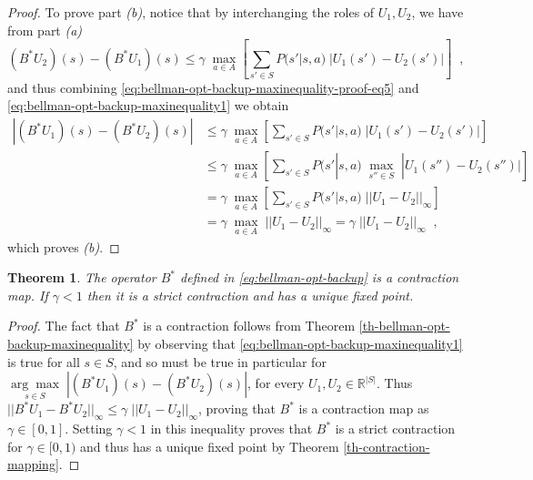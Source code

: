 \documentclass{article}
\newtheorem{theorem}{Theorem}[section]
\theoremstyle{definition}
\theoremstyle{remark}
\begin{document}
\begin{proof}
To prove part \textit{(b)}, notice that by interchanging the roles of $U_1, U_2$, we have from part \textit{(a)}
\begin{equation}
(B^{\ast}U_2)(s) - (B^{\ast}U_1)(s) \leq \gamma \; \underset{a \in A}{\max} \left[ \sum_{s' \in S} P(s'|s,a) \; |U_1(s') - U_2(s')| \right] \;\; ,
\label{eq:bellman-opt-backup-maxinequality-proof-eq5}
\end{equation}
and thus combining \eqref{eq:bellman-opt-backup-maxinequality-proof-eq5} and \eqref{eq:bellman-opt-backup-maxinequality1} we obtain
\begin{equation}
\begin{split}
|(B^{\ast}U_1)(s) - (B^{\ast}U_2)(s)| & \leq \gamma \; \underset{a \in A}{\max} \left[ \sum_{s' \in S} P(s'|s,a) \; |U_1(s') - U_2(s')| \right] \\
& \leq \gamma \; \underset{a \in A}{\max} \left[ \sum_{s' \in S} P(s'|s,a) \; \underset{s'' \in S}{\max} \; |U_1(s'') - U_2(s'')| \right] \\
&= \gamma \; \underset{a \in A}{\max} \left[ \sum_{s' \in S} P(s'|s,a) \; ||U_1 - U_2||_{\infty} \right] \\
&= \gamma \; \underset{a \in A}{\max} \; ||U_1 - U_2||_{\infty} = \gamma \; ||U_1 - U_2||_{\infty} \;\; ,
\end{split}
\label{eq:bellman-opt-backup-maxinequality-proof-eq6}
\end{equation}
which proves \textit{(b)}.
\end{proof}

\begin{theorem}
The operator $B^{\ast}$ defined in \eqref{eq:bellman-opt-backup} is a contraction map. If $\gamma < 1$ then it is a strict contraction and has a unique fixed point.
\label{th-bellman-opt-backup-contraction}
\end{theorem}

\begin{proof}
The fact that $B^{\ast}$ is a contraction follows from Theorem \ref{th-bellman-opt-backup-maxinequality} by observing that \eqref{eq:bellman-opt-backup-maxinequality1} is true for all $s \in S$, and so must be true in particular for $\underset{s \in S}{\arg\max} \; |(B^{\ast}U_1)(s) - (B^{\ast}U_2)(s)|$, for every $U_1, U_2 \in \mathbb{R}^{|S|}$. Thus $||B^{\ast}U_1 - B^{\ast}U_2||_{\infty} \leq \gamma \; ||U_1 - U_2||_{\infty}$, proving that $B^{\ast}$ is a contraction map as $\gamma \in [0,1]$. Setting $\gamma < 1$ in this inequality proves that $B^{\ast}$ is a strict contraction for $\gamma \in [0,1)$ and thus has a unique fixed point by Theorem \ref{th-contraction-mapping}.
\end{proof}
\end{document}
